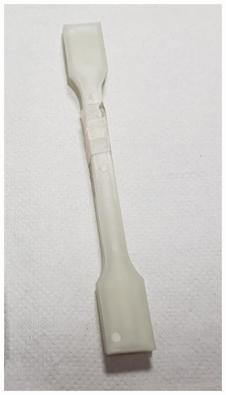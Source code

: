 \documentclass[a4paper, 11pt]{article}
\begin{document}
\begin{figure}[htp]
{\includegraphics[scale=0.25]{PPW}} \qquad
\subfloat[][]

\end{figure}
\end{document}
